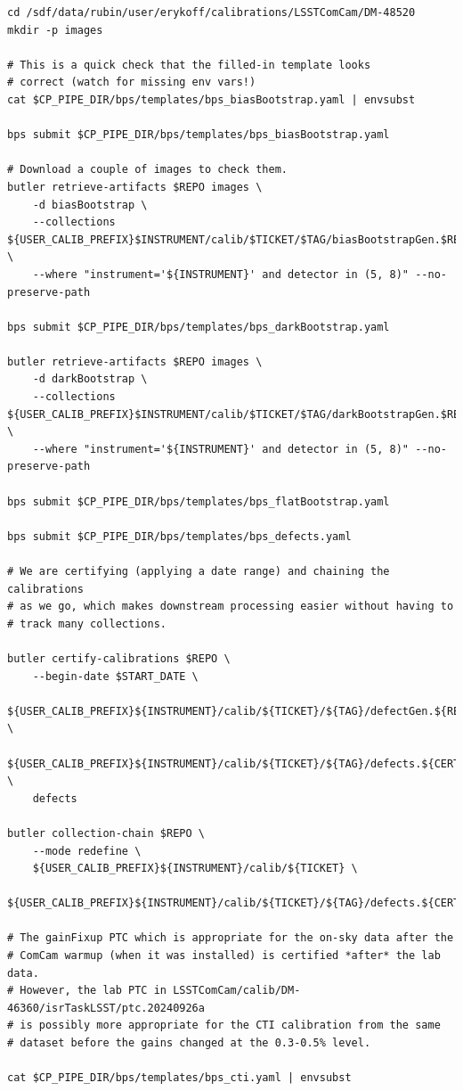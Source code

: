 \documentclass[DM,authoryear,toc]{lsstdoc}
\begin{document}
\begin{footnotesize}
\begin{verbatim}
cd /sdf/data/rubin/user/erykoff/calibrations/LSSTComCam/DM-48520
mkdir -p images

# This is a quick check that the filled-in template looks
# correct (watch for missing env vars!)
cat $CP_PIPE_DIR/bps/templates/bps_biasBootstrap.yaml | envsubst

bps submit $CP_PIPE_DIR/bps/templates/bps_biasBootstrap.yaml

# Download a couple of images to check them.
butler retrieve-artifacts $REPO images \
    -d biasBootstrap \
    --collections ${USER_CALIB_PREFIX}$INSTRUMENT/calib/$TICKET/$TAG/biasBootstrapGen.$RERUN/run${BOOTSTRAP_RUN_NUMBER} \
    --where "instrument='${INSTRUMENT}' and detector in (5, 8)" --no-preserve-path

bps submit $CP_PIPE_DIR/bps/templates/bps_darkBootstrap.yaml

butler retrieve-artifacts $REPO images \
    -d darkBootstrap \
    --collections ${USER_CALIB_PREFIX}$INSTRUMENT/calib/$TICKET/$TAG/darkBootstrapGen.$RERUN/run${BOOTSTRAP_RUN_NUMBER} \
    --where "instrument='${INSTRUMENT}' and detector in (5, 8)" --no-preserve-path

bps submit $CP_PIPE_DIR/bps/templates/bps_flatBootstrap.yaml

bps submit $CP_PIPE_DIR/bps/templates/bps_defects.yaml

# We are certifying (applying a date range) and chaining the calibrations
# as we go, which makes downstream processing easier without having to
# track many collections.

butler certify-calibrations $REPO \
    --begin-date $START_DATE \
    ${USER_CALIB_PREFIX}${INSTRUMENT}/calib/${TICKET}/${TAG}/defectGen.${RERUN} \
    ${USER_CALIB_PREFIX}${INSTRUMENT}/calib/${TICKET}/${TAG}/defects.${CERT_RERUN} \
    defects

butler collection-chain $REPO \
    --mode redefine \
    ${USER_CALIB_PREFIX}${INSTRUMENT}/calib/${TICKET} \
    ${USER_CALIB_PREFIX}${INSTRUMENT}/calib/${TICKET}/${TAG}/defects.${CERT_RERUN}

# The gainFixup PTC which is appropriate for the on-sky data after the
# ComCam warmup (when it was installed) is certified *after* the lab data.
# However, the lab PTC in LSSTComCam/calib/DM-46360/isrTaskLSST/ptc.20240926a
# is possibly more appropriate for the CTI calibration from the same
# dataset before the gains changed at the 0.3-0.5% level.

cat $CP_PIPE_DIR/bps/templates/bps_cti.yaml | envsubst


\end{verbatim}
\end{footnotesize}
\end{document}
